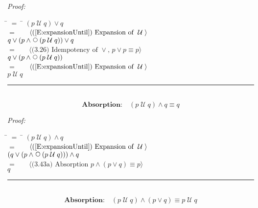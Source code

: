 \documentclass[fleqn, leqno]{article}
\newcommand{\lgap}{2pt}                             %
\newcommand{\mymathindent}{24pt}                    %
\newcommand{\Until}{\;\mathcal{U}\;}
\newcommand{\Next}{\;\,\text{\raisebox{3.5pt}{\circle{6}}}}
\newcommand{\myqed}{\hfill\rule[-.23ex]{1.2ex}{2.0ex}}
\newcommand{\Gll} {\langle}                         %
\newcommand{\Ggg} {\rangle}                         %
\newcommand{\Hint}[1]     {\ \ \ $\Gll              \mbox{#1} \Ggg$ }   %
\begin{document}
\emph{Proof:}
\begin{tabbing}
\hspace{\mymathindent} \= $= \;$ \= \kill
  \> \>   $(p \Until q) \lor q$\\[\lgap]
  \> $=$  \>  \Hint{(\ref{E:expansionUntil}) Expansion of $\Until$}\\[\lgap]
  \> \>   $q \lor (p \land \Next(p \Until q)) \lor q$\\[\lgap]
  \> $=$  \>  \Hint{(3.26) Idempotency of $\lor$, $p \lor p \equiv p$}\\[\lgap]
  \> \>   $q \lor (p \land \Next(p \Until q))$\\[\lgap]
  \> $=$  \>  \Hint{(\ref{E:expansionUntil}) Expansion of $\Until$}\\[\lgap]
  \> \>   $p \Until q$
\end{tabbing}
\myqed\\[\lgap]

\begin{equation}\label{E:untilAndQ}
\textbf{Absorption:}\quad (p \Until q) \land q \equiv q
\end{equation}

\emph{Proof:}
\begin{tabbing}
\hspace{\mymathindent} \= $= \;$ \= \kill
  \> \>   $(p \Until q) \land q$\\[\lgap]
  \> $=$  \>  \Hint{(\ref{E:expansionUntil}) Expansion of $\Until$}\\[\lgap]
  \> \>   $(q \lor (p \land \Next(p \Until q))) \land q$\\[\lgap]
  \> $=$  \>  \Hint{(3.43a) Absorption $p \land (p \lor q) \equiv p$}\\[\lgap]
  \> \>   $q$
\end{tabbing}
\myqed\\[\lgap]

\begin{equation}\label{E:untilAndOr}
\textbf{Absorption:}\quad (p \Until q) \land (p \lor q) \equiv p \Until q
\end{equation}
\end{document}
